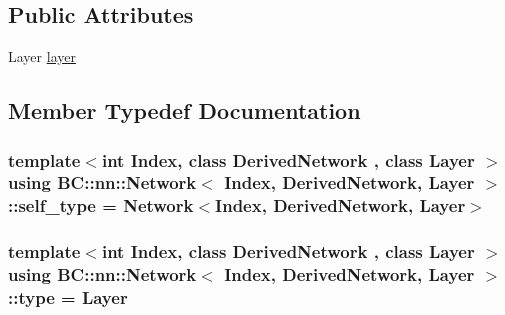 \subsection*{Public Attributes}
\begin{DoxyCompactItemize}
\item 
Layer \hyperlink{structBC_1_1nn_1_1Network_3_01Index_00_01DerivedNetwork_00_01Layer_01_4_a9b9c56012926ab07e1dbac3f92af7b61}{layer}
\end{DoxyCompactItemize}


\subsection{Member Typedef Documentation}
\subsubsection[{\texorpdfstring{self\+\_\+type}{self_type}}]{\setlength{\rightskip}{0pt plus 5cm}template$<$int Index, class Derived\+Network , class Layer $>$ using {\bf B\+C\+::nn\+::\+Network}$<$ Index, Derived\+Network, Layer $>$\+::{\bf self\+\_\+type} =  {\bf Network}$<$Index, Derived\+Network, Layer$>$}\hypertarget{structBC_1_1nn_1_1Network_3_01Index_00_01DerivedNetwork_00_01Layer_01_4_a93f653e29b7526a9d12105376fe305e4}{}\label{structBC_1_1nn_1_1Network_3_01Index_00_01DerivedNetwork_00_01Layer_01_4_a93f653e29b7526a9d12105376fe305e4}
\subsubsection[{\texorpdfstring{type}{type}}]{\setlength{\rightskip}{0pt plus 5cm}template$<$int Index, class Derived\+Network , class Layer $>$ using {\bf B\+C\+::nn\+::\+Network}$<$ Index, Derived\+Network, Layer $>$\+::{\bf type} =  Layer}\hypertarget{structBC_1_1nn_1_1Network_3_01Index_00_01DerivedNetwork_00_01Layer_01_4_ad4aa06ab69eeefd48555ca266da29512}{}\label{structBC_1_1nn_1_1Network_3_01Index_00_01DerivedNetwork_00_01Layer_01_4_ad4aa06ab69eeefd48555ca266da29512}


